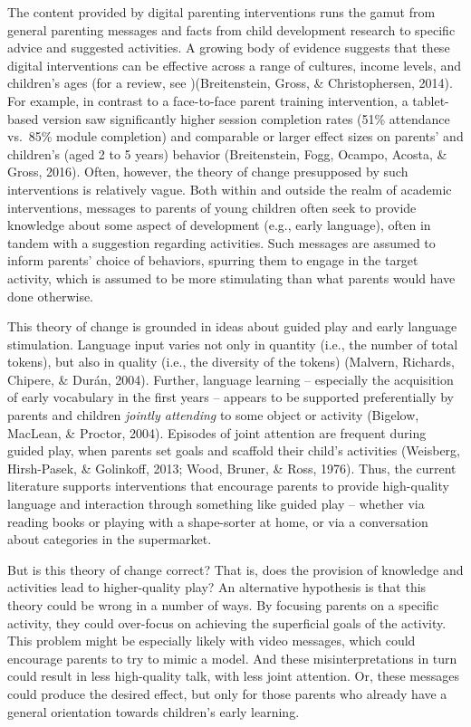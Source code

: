 \documentclass[]{article}
\begin{document}
The content provided by digital parenting interventions runs the gamut
from general parenting messages and facts from child development
research to specific advice and suggested activities. A growing body of
evidence suggests that these digital interventions can be effective
across a range of cultures, income levels, and children's ages (for a
review, see )(Breitenstein, Gross, \& Christophersen, 2014). For
example, in contrast to a face-to-face parent training intervention, a
tablet-based version saw significantly higher session completion rates
(51\% attendance vs.~85\% module completion) and comparable or larger
effect sizes on parents' and children's (aged 2 to 5 years) behavior
(Breitenstein, Fogg, Ocampo, Acosta, \& Gross, 2016). Often, however,
the theory of change presupposed by such interventions is relatively
vague. Both within and outside the realm of academic interventions,
messages to parents of young children often seek to provide knowledge
about some aspect of development (e.g., early language), often in tandem
with a suggestion regarding activities. Such messages are assumed to
inform parents' choice of behaviors, spurring them to engage in the
target activity, which is assumed to be more stimulating than what
parents would have done otherwise.

This theory of change is grounded in ideas about guided play and early
language stimulation. Language input varies not only in quantity (i.e.,
the number of total tokens), but also in quality (i.e., the diversity of
the tokens) (Malvern, Richards, Chipere, \& Durán, 2004). Further,
language learning -- especially the acquisition of early vocabulary in
the first years -- appears to be supported preferentially by parents and
children \emph{jointly attending} to some object or activity (Bigelow,
MacLean, \& Proctor, 2004). Episodes of joint attention are frequent
during guided play, when parents set goals and scaffold their child's
activities (Weisberg, Hirsh-Pasek, \& Golinkoff, 2013; Wood, Bruner, \&
Ross, 1976). Thus, the current literature supports interventions that
encourage parents to provide high-quality language and interaction
through something like guided play -- whether via reading books or
playing with a shape-sorter at home, or via a conversation about
categories in the supermarket.

But is this theory of change correct? That is, does the provision of
knowledge and activities lead to higher-quality play? An alternative
hypothesis is that this theory could be wrong in a number of ways. By
focusing parents on a specific activity, they could over-focus on
achieving the superficial goals of the activity. This problem might be
especially likely with video messages, which could encourage parents to
try to mimic a model. And these misinterpretations in turn could result
in less high-quality talk, with less joint attention. Or, these messages
could produce the desired effect, but only for those parents who already
have a general orientation towards children's early learning.
\end{document}
